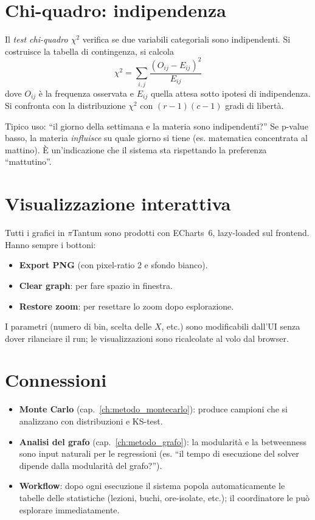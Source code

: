 \section{Chi-quadro: indipendenza}

\begin{defbox}
Il \emph{test chi-quadro
$\chi^2$} verifica se due variabili
categoriali sono indipendenti. Si costruisce la tabella di
contingenza, si calcola
\[
  \chi^2 = \sum_{i,j} \frac{(O_{ij} - E_{ij})^2}{E_{ij}}
\]
dove $O_{ij}$ \`e la frequenza osservata e $E_{ij}$ quella
attesa sotto ipotesi di indipendenza. Si confronta con la
distribuzione $\chi^2$ con $(r-1)(c-1)$ gradi di libert\`a.
\end{defbox}

Tipico uso: ``il giorno della settimana e la materia sono
indipendenti?'' Se p-value basso, la materia \emph{influisce}
su quale giorno si tiene (es. matematica concentrata al
mattino). \`E un'indicazione che il sistema sta rispettando
la preferenza ``mattutino''.

\section{Visualizzazione interattiva}

Tutti i grafici in $\pi$Tantum sono prodotti con
ECharts~6, lazy-loaded sul frontend. Hanno
sempre i bottoni:
\begin{itemize}
\item \textbf{Export PNG} (con pixel-ratio 2 e sfondo
  bianco).
\item \textbf{Clear graph}: per fare spazio in finestra.
\item \textbf{Restore zoom}: per resettare lo zoom dopo
  esplorazione.
\end{itemize}

I parametri (numero di bin, scelta delle $X$, etc.) sono
modificabili dall'UI senza dover rilanciare il run; le
visualizzazioni sono ricalcolate al volo dal browser.

\section{Connessioni}

\begin{connessionebox}
\begin{itemize}
\item \textbf{Monte Carlo} (cap.~\ref{ch:metodo_montecarlo}):
  produce campioni che si analizzano con distribuzioni
  e KS-test.
\item \textbf{Analisi del grafo}
  (cap.~\ref{ch:metodo_grafo}): la modularit\`a e la
  betweenness sono input naturali per le regressioni
  (es. ``il tempo di esecuzione del solver dipende dalla
  modularit\`a del grafo?'').
\item \textbf{Workflow}: dopo ogni esecuzione il sistema
  popola automaticamente le tabelle delle statistiche
  (lezioni, buchi, ore-isolate, etc.); il coordinatore le
  pu\`o esplorare immediatamente.
\end{itemize}
\end{connessionebox}

